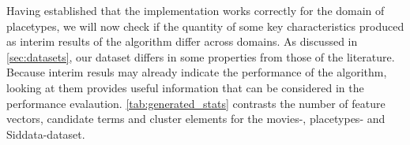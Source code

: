 Having established that the implementation works correctly for the domain of placetypes, we will now check if the quantity of some key characteristics produced as interim results of the algorithm differ across domains. As discussed in \autoref{sec:datasets}, our dataset differs in some properties from those of the literature. Because interim resuls may already indicate the performance of the algorithm, looking at them provides useful information that can be considered in the performance evalaution. \autoref{tab:generated_stats} contrasts the number of feature vectors, candidate terms and cluster elements for the movies-, placetypes- and Siddata-dataset.

